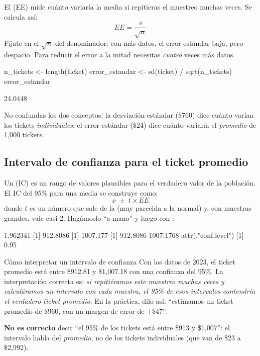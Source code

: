 El  (EE) mide cuánto variaría la media si repitieras
el muestreo muchas veces. Se calcula así:
\[
  EE = \frac{s}{\sqrt{n}}
\]
Fíjate en el $\sqrt{n}$ del denominador: con más datos, el error estándar
baja, pero despacio. Para reducir el error a la mitad necesitas
\emph{cuatro} veces más datos.

\begin{rcode}
n_tickets <- length(ticket)
error_estandar <- sd(ticket) / sqrt(n_tickets)
error_estandar
\end{rcode}
\begin{rsalida}
[1] 24.0448
\end{rsalida}

No confundas los dos conceptos: la desviación estándar (\$760) dice cuánto
varían los tickets \emph{individuales}; el error estándar (\$24) dice cuánto
variaría el \emph{promedio} de 1,000 tickets.

\subsection{Intervalo de confianza para el ticket promedio}

Un  (IC) es un rango de valores plausibles
para el verdadero valor de la población. El IC del 95\% para una media se
construye como:
\[
  \bar{x} \;\pm\; t \times EE
\]
donde $t$ es un número que sale de la 
(muy parecida a la normal) y, con muestras grandes, vale casi 2. Hagámoslo
``a mano'' y luego con :

\begin{rsalida}
[1] 1.962341
[1] 912.8086
[1] 1007.177
[1]  912.8086 1007.1768
attr(,"conf.level")
[1] 0.95
\end{rsalida}

\begin{concepto}{Cómo interpretar un intervalo de confianza}
Con los datos de 2023, el ticket promedio está entre \$912.81 y \$1,007.18
con una confianza del 95\%. La interpretación correcta es: \emph{si
repitiéramos este muestreo muchas veces y calculáramos un intervalo con cada
muestra, el 95\% de esos intervalos contendría el verdadero ticket
promedio}. En la práctica, dilo así: ``estimamos un ticket promedio de \$960,
con un margen de error de $\pm$\$47''.

\textbf{No es correcto} decir ``el 95\% de los tickets está entre \$913 y
\$1,007'': el intervalo habla del \emph{promedio}, no de los tickets
individuales (que van de \$23 a \$2,992).
\end{concepto}

